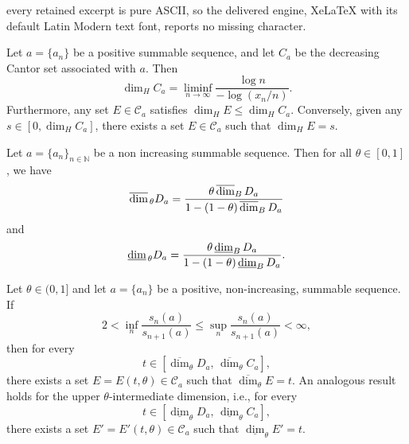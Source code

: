 \documentclass[10pt,a4paper]{amsart}
\newcommand\da{\underline{\mbox{\rm dim}}_{\,\theta}} %
\newcommand\lbd{\underline{\mbox{\rm dim}}_{\rm B}\,} %
\newcommand\ubd{\overline{\mbox{\rm dim}}_{\rm B}\,} %
\newcommand\uda{\overline{\mbox{\rm dim}}_{\,\theta}} %
\begin{document}
every retained excerpt is pure ASCII, so the delivered engine, XeLaTeX with its default Latin Modern text font, reports no missing character.
\begin{prop}\label{hausdorff cantor}
Let $a = \{a_n\}$ be a positive summable sequence, and let $C_a$ be the decreasing Cantor set associated with $a$. Then
\[
\dim_H C_{a} = \liminf_{n \to \infty} \frac{\log n}{-\log (x_n/n)}.
\]
Furthermore, any set $E \in \mathcal{C}_{a}$ satisfies $\dim_H E \leq \dim_H C_{a}$. Conversely, given any $s \in [0, \dim_H C_{a}]$, there exists a set $E \in \mathcal{C}_a$ such that $\dim_H E = s$.
\end{prop}

\begin{theo}\label{dimension de suceciones} 
Let \(a=\{a_n\}_{n\in\mathbb{N}}\) be a non increasing summable sequence. Then for all \(\theta\in [0,1]\), we have
\begin{equation}\label{Theo inciso 11}
\uda D_{\textbf{a}} = \frac{\theta \, \ubd D_{\textbf{a}} }{1 - (1-\theta)\, \ubd D_{\textbf{a}}}
\end{equation}
and  
\[
\da D_{\textbf{a}} = \frac{\theta \, \lbd D_{\textbf{a}} }{1 - (1-\theta)\, \lbd D_{\textbf{a}} }.
\]
\end{theo}

\begin{theo}\label{Maintheo}
Let \( \theta \in (0,1] \) and let \( a = \{a_n\} \) be a positive, non-increasing, summable sequence. If 
\[
2 < \inf_n \frac{s_n(a)}{s_{n+1}(a)} \leq \sup_n \frac{s_n(a)}{s_{n+1}(a)} < \infty,
\]
then for every 
\[
t \in \left[ \overline{\dim}_\theta D_a, \, \overline{\dim}_\theta C_a \right],
\]
there exists a set \( E = E(t, \theta) \in \mathcal{C}_a \) such that \( \overline{\dim}_\theta E = t \). An analogous result holds for the upper $\theta$-intermediate dimension, i.e., for every 
\[
t \in \left[ \underline{\dim}_\theta D_a, \, \underline{\dim}_\theta C_a \right],
\]
there exists a set \( E' = E'(t, \theta) \in \mathcal{C}_a \) such that \( \underline{\dim}_\theta E' = t \).
\end{theo}
\end{document}

